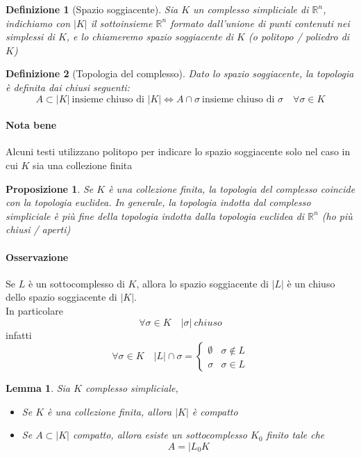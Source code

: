 \documentclass[a4paper]{report}
\newtheorem{proposition}{Proposizione}
\newtheorem{definition}{Definizione}
\newtheorem{lemma}{Lemma}
\newcommand{\R}{\ensuremath{\mathbb{R}}}
\begin{document}
\begin{definition}[Spazio soggiacente]
    Sia $K$ un complesso simpliciale di $\R^n$, indichiamo con $|K|$ il sottoinsieme $\R^n$ formato dall'unione di punti contenuti nei simplessi di $K$, e lo chiameremo spazio soggiacente di $K$ (o politopo / poliedro di $K$)
\end{definition}
\begin{definition}[Topologia del complesso]
    Dato lo spazio soggiacente, la topologia è definita dai chiusi seguenti:
    \[
        A\subset|K|\ \text{insieme chiuso di }|K|\Longleftrightarrow A\cap\sigma\ \text{insieme chiuso di }\sigma\quad\forall\sigma\in K
    \]
\end{definition}
\paragraph{Nota bene} Alcuni testi utilizzano politopo per indicare lo spazio soggiacente solo nel caso in cui $K$ sia una collezione finita
\begin{proposition}
    Se $K$ è una collezione finita, la topologia del complesso coincide con la topologia euclidea. In generale, la topologia indotta dal complesso simpliciale è più fine della topologia indotta dalla topologia euclidea di $\R^n$ (ho più chiusi / aperti)
\end{proposition}
\paragraph{Osservazione} Se $L$ è un sottocomplesso di $K$, allora lo spazio soggiacente di $|L|$ è un chiuso dello spazio soggiacente di $|K|$.\\
In particolare
\[
    \forall\sigma\in K\quad |\sigma|\ chiuso
\]
infatti
\[
    \forall\sigma\in K\quad |L|\cap\sigma=\left\{\begin{array}{ll}
        \emptyset & \sigma\notin L \\
        \sigma    & \sigma\in L
    \end{array} \right.
\]
\begin{lemma}
    Sia $K$ complesso simpliciale,
    \begin{itemize}
        \item Se $K$ è una collezione finita, allora $|K|$ è compatto
        \item Se $A\subset|K|$ compatto, allora esiste un sottocomplesso $K_0$ finito tale che
              \[
                  A=|L_0K
              \]
    \end{itemize}
\end{lemma}
\end{document}
